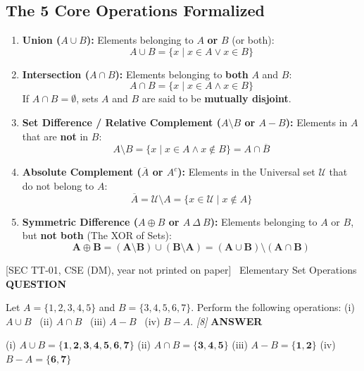 \documentclass[11pt,a4paper]{article}
\newcommand{\Qlabel}{\textbf{\color{navy}\footnotesize\MakeUppercase{Question}}\par\smallskip}
\newcommand{\Alabel}{\textbf{\color{teal}\footnotesize\MakeUppercase{Answer}}\par\smallskip}
\begin{document}
\subsection{The 5 Core Operations Formalized}
\begin{defbox}
\begin{enumerate}
    \item \textbf{Union ($A \cup B$):} Elements belonging to $A$ \textbf{or} $B$ (or both):
    \[
    A \cup B = \{x \mid x \in A \lor x \in B\}
    \]
    \item \textbf{Intersection ($A \cap B$):} Elements belonging to \textbf{both} $A$ and $B$:
    \[
    A \cap B = \{x \mid x \in A \land x \in B\}
    \]
    If $A \cap B = \emptyset$, sets $A$ and $B$ are said to be \textbf{mutually disjoint}.
    \item \textbf{Set Difference / Relative Complement ($A \setminus B$ or $A - B$):} Elements in $A$ that are \textbf{not} in $B$:
    \[
    A \setminus B = \{x \mid x \in A \land x \notin B\} = A \cap \overline{B}
    \]
    \item \textbf{Absolute Complement ($\overline{A}$ or $A^c$):} Elements in the Universal set $\mathcal{U}$ that do not belong to $A$:
    \[
    \overline{A} = \mathcal{U} \setminus A = \{x \in \mathcal{U} \mid x \notin A\}
    \]
    \item \textbf{Symmetric Difference ($A \oplus B$ or $A \ \Delta \ B$):} Elements belonging to $A$ or $B$, but \textbf{not both} (The XOR of Sets):
    \[
    \mathbf{A \oplus B = (A \setminus B) \cup (B \setminus A) = (A \cup B) \setminus (A \cap B)}
    \]
\end{enumerate}
\end{defbox}

\begin{exambox}{[SEC TT-01, CSE (DM), year not printed on paper] \ Elementary Set Operations}
\Qlabel
Let $A = \{1, 2, 3, 4, 5\}$ and $B = \{3, 4, 5, 6, 7\}$. Perform the following operations: (i) $A \cup B$ \ (ii) $A \cap B$ \ (iii) $A - B$ \ (iv) $B - A$. \hfill\textit{[8]}
\tcblower
\Alabel
(i) $A \cup B = \mathbf{\{1,2,3,4,5,6,7\}}$ \quad (ii) $A \cap B = \mathbf{\{3,4,5\}}$ \quad (iii) $A - B = \mathbf{\{1,2\}}$ \quad (iv) $B - A = \mathbf{\{6,7\}}$
\end{exambox}
\end{document}
